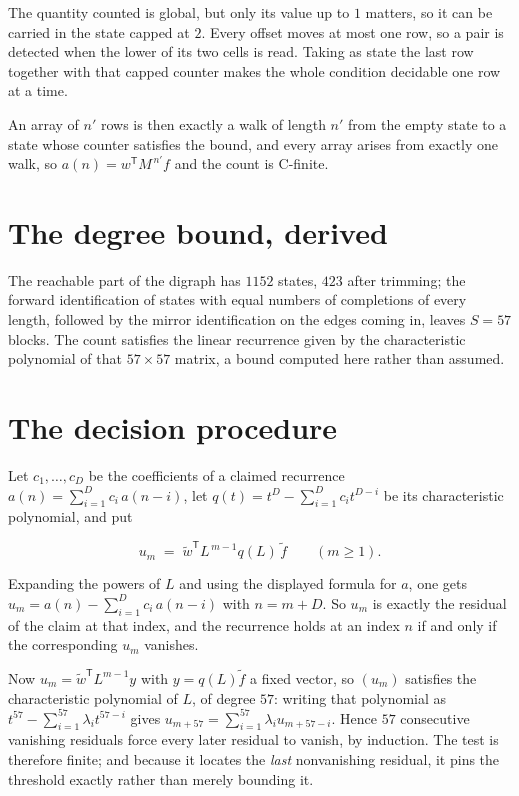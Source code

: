\documentclass[11pt]{article}
\theoremstyle{definition}
\begin{document}
The quantity counted is global, but only its value up to $1$ matters, so it can be carried in the state capped at $2$. Every offset moves at most one row, so a pair is detected when the lower of its two cells is read. Taking as state the last row together with that capped counter makes the whole condition decidable one row at a time.

An array of $n'$ rows is then exactly a walk of length $n'$ from the empty state to a state whose counter satisfies the bound, and every array arises from exactly one walk, so $a(n) = w^{\mathsf T}M^{\,n'}f$ and the count is C-finite.

\section{The degree bound, derived}

The reachable part of the digraph has $1152$ states, $423$ after trimming; the forward identification of states with equal numbers of completions of every length, followed by the mirror identification on the edges coming in, leaves $S = 57$ blocks. The count satisfies the linear recurrence given by the characteristic polynomial of that $57\times57$ matrix, a bound computed here rather than assumed.

\section{The decision procedure}

Let $c_1,\dots,c_D$ be the coefficients of a claimed recurrence $a(n) = \sum_{i=1}^{D} c_i\,a(n-i)$, let $q(t) = t^{D} - \sum_{i=1}^{D} c_i t^{D-i}$ be its characteristic polynomial, and put

\[u_m \;=\; \tilde w^{\mathsf T} L^{\,m-1} q(L)\,\tilde f \qquad (m \ge 1).\]

Expanding the powers of $L$ and using the displayed formula for $a$, one gets $u_m = a(n) - \sum_{i=1}^{D} c_i\,a(n-i)$ with $n = m + D$. So $u_m$ is exactly the residual of the claim at that index, and the recurrence holds at an index $n$ if and only if the corresponding $u_m$ vanishes.

Now $u_m = \tilde w^{\mathsf T} L^{m-1} y$ with $y = q(L)\tilde f$ a fixed vector, so $(u_m)$ satisfies the characteristic polynomial of $L$, of degree $57$: writing that polynomial as $t^{57} - \sum_{i=1}^{57} \lambda_i t^{57-i}$ gives $u_{m+57} = \sum_{i=1}^{57} \lambda_i u_{m+57-i}$. Hence $57$ consecutive vanishing residuals force every later residual to vanish, by induction. The test is therefore finite; and because it locates the {\itshape last} nonvanishing residual, it pins the threshold exactly rather than merely bounding it.
\end{document}
